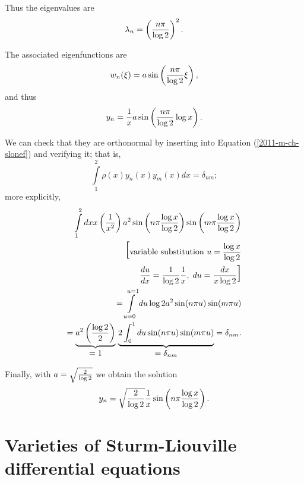 {Thus the eigenvalues are
\begin{equation}
\lambda_n=
\left({n\pi\over\log2}\right)^2.
\end{equation}

The associated eigenfunctions are
\begin{equation}
w _n(\xi)=a\sin\left({n\pi\over\log2}
\xi\right),
\end{equation}
and thus
\begin{equation}
y_n={1\over x}a\sin\left({n\pi\over\log2}
\log x\right).
\end{equation}

We can check that they are orthonormal by inserting into Equation (\ref{2011-m-ch-slonef})
and verifying it; that is,
\begin{equation}
\int\limits_1^2 \rho (x)y_n(x)
y_m(x)dx=\delta_{nm};
\end{equation}
more explicitly,
\begin{equation}
\begin{split}
\int\limits_1^2 dx x\left({1\over x^2}\right)a^2
   \sin\left(n\pi{\log x\over\log2}\right)\sin\left(m\pi
   {\log x\over\log2}\right)\\
 \textrm{\huge [} \textrm{variable substitution } u={\log x\over\log2}\\
    {du\over dx}=
{1\over\log2}{1\over x},\; du={dx\over x\log2} \textrm{\huge ]}\\
  =
\int\limits_{u=0}^{u=1}
  du\log2a^2\sin(n\pi u)\sin(m\pi u)\\
  =
\underbrace{a^2\left({\log2\over2}\right)}_{\mbox{$=1$}}\,
\underbrace{2 \int_0^1du \sin(n\pi u)\sin(m\pi
u)}_{\mbox{$=\delta_{nm}$}}
 = \delta_{nm}.
\end{split}
\end{equation}

Finally, with $a=\sqrt{2\over\log 2}$
we obtain the solution
\begin{equation}
y_n=\sqrt{2\over\log2}{1\over x}
\sin\left(n\pi{\log x\over\log2}\right).
\end{equation}

\eexample
}







\section{Varieties of Sturm-Liouville differential equations}

